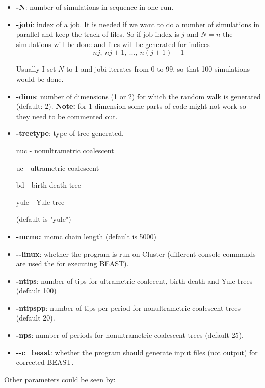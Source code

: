 \begin{itemize}
\item \textbf{-N}: number of simulations in sequence in one run.
\item \textbf{-jobi}: index of a job. It is needed if we want to do a number of simulations in parallel and keep the track of files. So if job index is $j$ and $N=n$ the simulations will be done and files will be generated for indices
$$nj, \ nj+1, \ ... , \ n(j+1) - 1$$ 

Usually I set $N$ to 1 and jobi iterates from 0 to 99, so that 100 simulations would be done.


\item \textbf{-dims}: number of dimensions (1 or 2) for which the random walk is generated (default: 2). \textbf{Note:} for 1 dimension some parts of code might not work so they need to be commented out.

\item \textbf{-treetype}: type of tree generated.

nuc - nonultrametric coalescent

uc - ultrametric coalescent

bd - birth-death tree

yule - Yule tree

(default is "yule")
\item \textbf{-mcmc}: mcmc chain length (default is 5000)

\item \textbf{-{}-linux}: whether the program is run on Cluster (different console commands are used the for executing BEAST).

\item \textbf{-ntips}: number of tips for ultrametric coalecent, birth-death and Yule trees (default 100)

\item \textbf{-ntipspp}: number of tips per period for nonultrametric coalescent trees (default 20).

\item \textbf{-nps}: number of periods for nonultrametric coalescent trees (default 25).

\item \textbf{-{}-c\_beast}: whether the program should generate input files (not output) for corrected BEAST.


\end{itemize}

Other parameters could be seen by:

